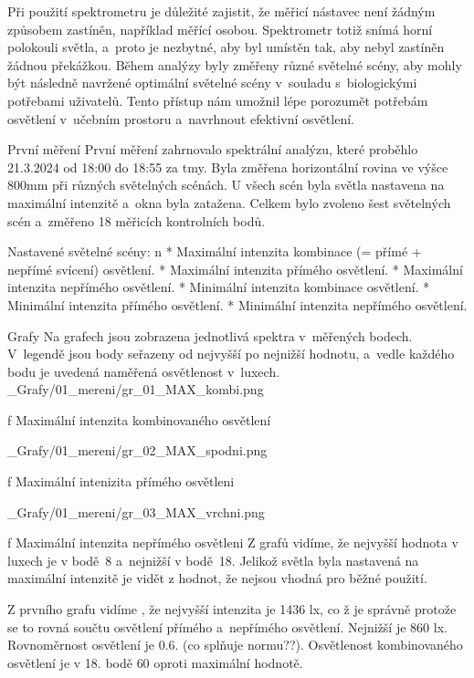 Při použití spektrometru je důležité zajistit, že měřicí nástavec není žádným způsobem zastíněn,
například měřící osobou. Spektrometr totiž snímá horní polokouli světla, a~proto je nezbytné, aby byl umístěn tak, aby nebyl zastíněn žádnou překážkou.
\medskip
Během analýzy byly změřeny různé světelné scény, aby mohly být následně navržené optimální světelné scény
v~souladu s~biologickými potřebami uživatelů. Tento přístup nám umožnil lépe porozumět potřebám osvětlení
v~učebním prostoru a~navrhnout efektivní osvětlení.%

\sec První měření
První měření zahrnovalo spektrální analýzu, které proběhlo 21.3.2024 od 18:00 do 18:55 za tmy. Byla změřena horizontální rovina ve výšce 800mm
při různých světelných scénách. U všech scén byla světla nastavena na maximální intenzitě a~okna byla zatažena.
Celkem bylo zvoleno šest světelných scén a~změřeno 18 měřicích kontrolních bodů.

\medskip\noindent
{\sbf Nastavené světelné scény:}
\begitems \style n
    * Maximální intenzita kombinace (= přímé + nepřímé svícení) osvětlení.
    * Maximální intenzita přímého osvětlení.
    * Maximální intenzita nepřímého osvětlení.
    * Minimální intenzita kombinace osvětlení.
    * Minimální intenzita přímého osvětlení.
    * Minimální intenzita nepřímého osvětlení.
\enditems

\secc Grafy
Na grafech jsou zobrazena jednotlivá spektra v~měřených bodech. V~legendě jsou body seřazeny od nejvyšší
po nejnižší hodnotu, a~vedle každého bodu je uvedená naměřená osvětlenost v~luxech.
\medskip {}
\picw=15cm _Grafy/01_mereni/gr_01_MAX_kombi.png
\caption/f Maximální intenzita kombinovaného osvětlení

\medskip {}
\picw=15cm _Grafy/01_mereni/gr_02_MAX_spodni.png
\caption/f Maximální intenizita přímého osvětleni

\medskip {}
\picw=15cm _Grafy/01_mereni/gr_03_MAX_vrchni.png
\caption/f Maximální intenzita nepřímého osvětleni
\medskip
Z grafů vidíme, že nejvyšší hodnota v luxech je v bodě~8 a~nejnižší v bodě~18. Jelikož světla byla nastavená na maximální intenzitě
je vidět z hodnot, že nejsou vhodná pro běžné použití.

Z prvního grafu vidíme , že nejvyšší intenzita je 1436 lx, co ž je správně protože se to rovná součtu osvětlení přímého a~nepřímého osvětlení. Nejnižší je
860 lx. Rovnoměrnost osvětlení je 0.6. (co splňuje normu??). Osvětlenost kombinovaného osvětlení je v 18. bodě {60\pcent} oproti maximální hodnotě.

